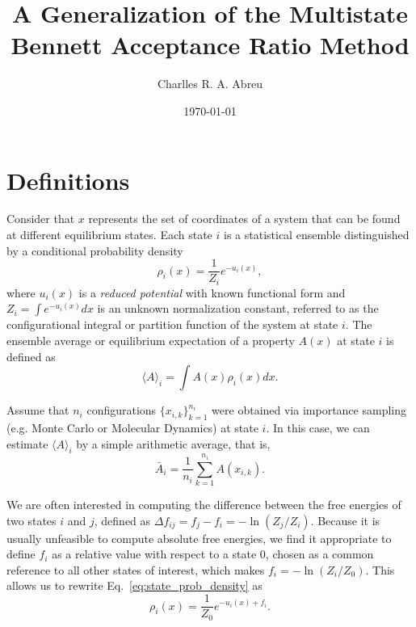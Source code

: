 \documentclass[aip,jcp,preprint,amsmath,amssymb]{revtex4-1}
\begin{document}
\title{A Generalization of the Multistate Bennett Acceptance Ratio Method}

\author{Charlles R. A. Abreu}

\date{\today}

\maketitle

\section{Definitions}
\label{sec:definitions}

Consider that $x$ represents the set of coordinates of a system that can be found at different equilibrium states. Each state $i$ is a statistical ensemble distinguished by a conditional probability density
\begin{equation}
\label{eq:state_prob_density}
\rho_i(x) = \frac{1}{Z_i} e^{-u_i(x)},
\end{equation}
where $u_i(x)$ is a \textit{reduced potential}\cite{Shirts_2008, Chodera_2011} with known functional form and $Z_i = \int e^{-u_i(x)}dx$ is an unknown normalization constant, referred to as the configurational integral or partition function of the system at state $i$. The ensemble average or equilibrium expectation of a property $A(x)$ at state $i$ is defined as
\begin{equation}
\label{eq:ensemble-average}
\langle A \rangle_i = \int A(x)\rho_i(x)dx.
\end{equation}

Assume that $n_i$ configurations $\{x_{i,k}\}_{k=1}^{n_i}$ were obtained via importance sampling\cite{Allen_1987} (e.g. Monte Carlo or Molecular Dynamics) at state $i$. In this case, we can estimate $\langle A \rangle_i$ by a simple arithmetic average, that is,
\begin{equation}
\label{eq:average_estimator}
\bar A_i = \frac{1}{n_i} \sum_{k=1}^{n_i} A(x_{i,k}).
\end{equation}

We are often interested in computing the difference between the free energies of two states $i$ and $j$, defined as $\Delta f_{ij} = f_j - f_i = - \ln (Z_j/Z_i)$. Because it is usually unfeasible to compute absolute free energies, we find it appropriate to define $f_i$ as a relative value with respect to a state $0$, chosen as a common reference to all other states of interest, which makes $f_i = -\ln (Z_i/Z_0)$. This allows us to rewrite Eq.~\eqref{eq:state_prob_density} as
\begin{equation}
\label{eq:state_prob_density_Z0}
\rho_i(x) = \frac{1}{Z_0} e^{-u_i(x)+ f_i}.
\end{equation}
\end{document}
